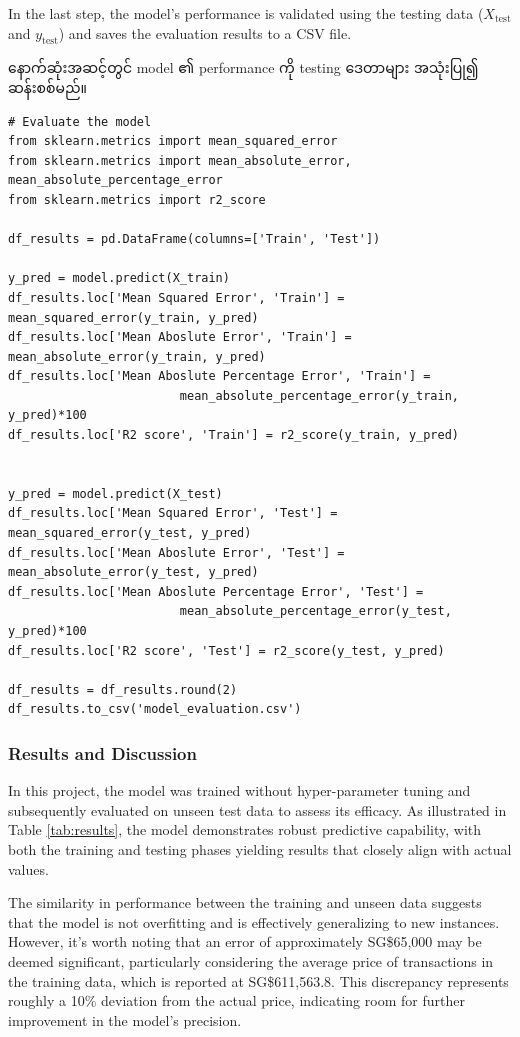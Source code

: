 \begin{step}
In the last step, the model's performance is validated using the testing data (\(X_{\text{test}}\) and \(y_{\text{test}}\)) and saves the evaluation results to a CSV file.

နောက်ဆုံးအဆင့်တွင် model ၏ performance ကို testing ဒေတာများ အသုံးပြု၍ ဆန်းစစ်မည်။ 

\begin{lstlisting}
# Evaluate the model
from sklearn.metrics import mean_squared_error
from sklearn.metrics import mean_absolute_error, mean_absolute_percentage_error
from sklearn.metrics import r2_score

df_results = pd.DataFrame(columns=['Train', 'Test'])

y_pred = model.predict(X_train)
df_results.loc['Mean Squared Error', 'Train'] = mean_squared_error(y_train, y_pred)
df_results.loc['Mean Aboslute Error', 'Train'] = mean_absolute_error(y_train, y_pred)
df_results.loc['Mean Aboslute Percentage Error', 'Train'] = 
                        mean_absolute_percentage_error(y_train, y_pred)*100
df_results.loc['R2 score', 'Train'] = r2_score(y_train, y_pred)


y_pred = model.predict(X_test)
df_results.loc['Mean Squared Error', 'Test'] = mean_squared_error(y_test, y_pred)
df_results.loc['Mean Aboslute Error', 'Test'] = mean_absolute_error(y_test, y_pred)
df_results.loc['Mean Aboslute Percentage Error', 'Test'] = 
                        mean_absolute_percentage_error(y_test, y_pred)*100
df_results.loc['R2 score', 'Test'] = r2_score(y_test, y_pred)

df_results = df_results.round(2)
df_results.to_csv('model_evaluation.csv')
\end{lstlisting}
\end{step}

\subsubsection{Results and Discussion}
In this project, the model was trained without hyper-parameter tuning and subsequently evaluated on unseen test data to assess its efficacy. As illustrated in Table \ref{tab:results}, the model demonstrates robust predictive capability, with both the training and testing phases yielding results that closely align with actual values. 

The similarity in performance between the training and unseen data suggests that the model is not overfitting and is effectively generalizing to new instances. However, it's worth noting that an error of approximately SG\$65,000 may be deemed significant, particularly considering the average price of transactions in the training data, which is reported at SG\$611,563.8. This discrepancy represents roughly a 10\% deviation from the actual price, indicating room for further improvement in the model's precision.


